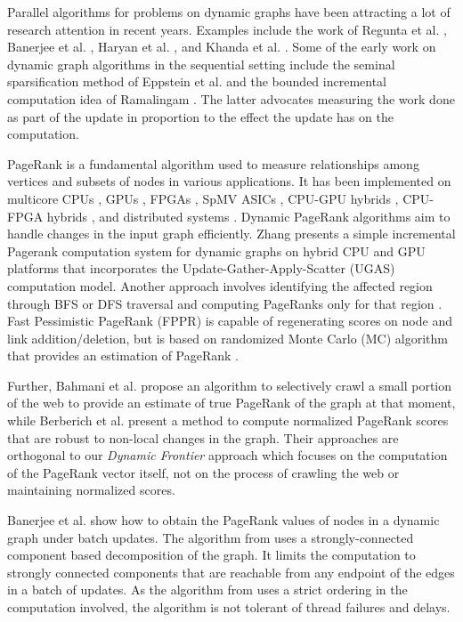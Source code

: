 Parallel algorithms for problems on dynamic graphs have been attracting a lot of research attention in recent years. Examples include the work of Regunta et al. \cite{cent-regunta21}, Banerjee et al. \cite{rank-sahu22}, Haryan et al. \cite{cc-haryan22}, and Khanda et al. \cite{hipc22}. Some of the early work on dynamic graph algorithms in the sequential setting include the seminal sparsification method of Eppstein et al. \cite{graph-eppstein97} and the bounded incremental computation idea of Ramalingam \cite{incr-ramalingam96}. The latter advocates measuring the work done as part of the update in proportion to the effect the update has on the computation.

PageRank is a fundamental algorithm used to measure relationships among vertices and subsets of nodes in various applications. It has been implemented on multicore CPUs \cite{rank-garg16}, GPUs \cite{rapids}, FPGAs \cite{rank-guoqiang20}, SpMV ASICs \cite{rank-sadi18}, CPU-GPU hybrids \cite{rank-giri20}, CPU-FPGA hybrids \cite{rank-li21}, and distributed systems \cite{rank-sarma13}. Dynamic PageRank algorithms aim to handle changes in the input graph efficiently. Zhang \cite{rank-zhang17} presents a simple incremental Pagerank computation system for dynamic graphs on hybrid CPU and GPU platforms that incorporates the Update-Gather-Apply-Scatter (UGAS) computation model. Another approach involves identifying the affected region through BFS or DFS traversal and computing PageRanks only for that region \cite{rank-desikan05, rank-giri20}. Fast Pessimistic PageRank (FPPR) is capable of regenerating scores on node and link addition/deletion, but is based on randomized Monte Carlo (MC) algorithm that provides an estimation of PageRank \cite{rank-pashikanti22}.

Further, Bahmani et al. \cite{rank-bahmani12} propose an algorithm to selectively crawl a small portion of the web to provide an estimate of true PageRank of the graph at that moment, while Berberich et al. \cite{rank-berberich07} present a method to compute normalized PageRank scores that are robust to non-local changes in the graph. Their approaches are orthogonal to our \textit{Dynamic Frontier} approach which focuses on the computation of the PageRank vector itself, not on the process of crawling the web or maintaining normalized scores.

Banerjee et al. \cite{rank-sahu22} show how to obtain the PageRank values of nodes in a dynamic graph under batch updates. The algorithm from \cite{rank-sahu22} uses a strongly-connected component based decomposition of the graph. It limits the computation to strongly connected components that are reachable from any endpoint of the edges in a batch of updates. As the algorithm from \cite{rank-sahu22} uses a strict ordering in the computation involved, the algorithm is not tolerant of thread failures and delays. %

